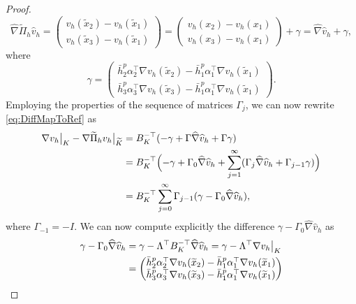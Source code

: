 \begin{proof}
\begin{equation}
	\widehat\nabla \widetilde \Pi_h \widehat v_h = \begin{pmatrix} v_h(\tilde x_2) - v_h(\tilde x_1) \\
													 v_h(\tilde x_3) - v_h(\tilde x_1) \end{pmatrix}
								   = \begin{pmatrix} v_h(x_2) - v_h(x_1) \\
								   					 v_h(x_3) - v_h(x_1) \end{pmatrix} + \gamma
								   = \widehat \nabla \widehat v_h + \gamma,
\end{equation}
where 
\begin{equation}
	\gamma = \begin{pmatrix} \bar h_2^p \alpha_2^\top \nabla v_h(\tilde x_2) - \bar h_1^p \alpha_1^\top \nabla v_h(\tilde x_1) \\
	\bar h_3^p \alpha_3^\top \nabla v_h(\tilde x_3) - \bar h_1^p \alpha_1^\top \nabla v_h(\tilde x_1) \end{pmatrix}.
\end{equation}
Employing the properties of the sequence of matrices $\Gamma_j$, we can now rewrite \eqref{eq:DiffMapToRef} as
\begin{equation}\label{eq:SumExpansionGradGradTilde}
\begin{aligned}
	\nabla v_h\bigr\rvert_{K} - \nabla \widetilde \Pi_h v_h \bigr\rvert_{\widetilde K} &= B_K^{-\top}(-\gamma + \Gamma \widehat \nabla \widehat v_h + \Gamma \gamma) \\
	&= B_K^{-\top} \Bigl(-\gamma + \Gamma_0 \widehat \nabla \widehat v_h + \sum_{j=1}^\infty (\Gamma_j \widehat \nabla \widehat v_h + \Gamma_{j-1} \gamma)\Bigr) \\
	&= B_K^{-\top} \sum_{j=0}^\infty \Gamma_{j-1} (\gamma -\Gamma_0 \widehat \nabla \widehat v_h),
\end{aligned}
\end{equation}
where $\Gamma_{-1} = -I$. We can now compute explicitly the difference $\gamma - \Gamma_0 \widehat\nabla \widehat v_h$ as
\begin{equation}
\begin{aligned}
	\gamma - \Gamma_0 \widehat \nabla \widehat v_h &= \gamma - \Lambda^\top B_K^{-\top} \widehat \nabla \widehat v_h = \gamma - \Lambda^\top \nabla v_h \eval{K} \\
	&= \begin{pmatrix}  \bar h_2^p \alpha_2^\top \nabla v_h(\tilde x_2) - \bar h_1^p \alpha_1^\top \nabla v_h(\tilde x_1) \\
						\bar h_3^p \alpha_3^\top \nabla v_h(\tilde x_3) - \bar h_1^p \alpha_1^\top \nabla v_h(\tilde x_1) \end{pmatrix}

\end{aligned}
\end{equation}
\end{proof}
